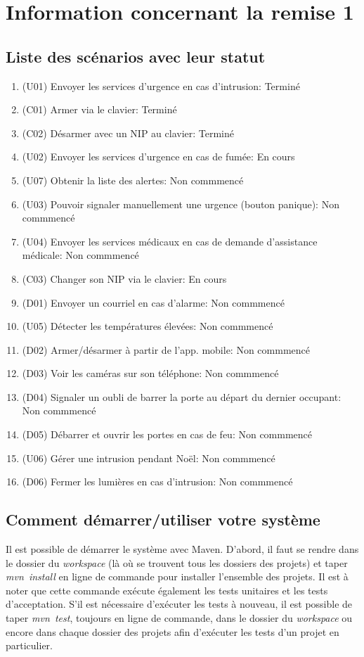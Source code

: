 
\chapter*{Information concernant la remise 1}

\section*{Liste des scénarios avec leur statut}
\begin{enumerate}
	\item (U01) Envoyer les services d'urgence en cas d'intrusion: Terminé
	\item (C01) Armer via le clavier: Terminé
	\item (C02) Désarmer avec un NIP au clavier: Terminé
	\item (U02) Envoyer les services d'urgence en cas de fumée: En cours
	\item (U07) Obtenir la liste des alertes: Non commmencé
	\item (U03) Pouvoir signaler manuellement une urgence (bouton panique): Non commmencé
	\item (U04) Envoyer les services médicaux en cas de demande d'assistance médicale: Non commmencé
	\item (C03) Changer son NIP via le clavier: En cours
	\item (D01) Envoyer un courriel en cas d'alarme: Non commmencé
	\item (U05) Détecter les températures élevées: Non commmencé
	\item (D02) Armer/désarmer à partir de l'app. mobile: Non commmencé
	\item (D03) Voir les caméras sur son téléphone: Non commmencé
	\item (D04) Signaler un oubli de barrer la porte au départ du dernier occupant: Non commmencé
	\item (D05) Débarrer et ouvrir les portes en cas de feu: Non commmencé
	\item (U06) Gérer une intrusion pendant Noël: Non commmencé
	\item (D06) Fermer les lumières en cas d'intrusion: Non commmencé
\end{enumerate}

\section*{Comment démarrer/utiliser votre système}
Il est possible de démarrer le système avec Maven. D'abord, il faut se rendre dans le dossier du \emph{workspace} (là où se trouvent tous les dossiers des projets) et taper \emph{mvn\ install} en ligne de commande pour installer l'ensemble des projets. Il est à noter que cette commande exécute également les tests unitaires et les tests d'acceptation. S'il est nécessaire d'exécuter les tests à nouveau, il est possible de taper \emph{mvn\ test}, toujours en ligne de commande, dans le dossier du \emph{workspace} ou encore dans chaque dossier des projets afin d'exécuter les tests d'un projet en particulier.\\

